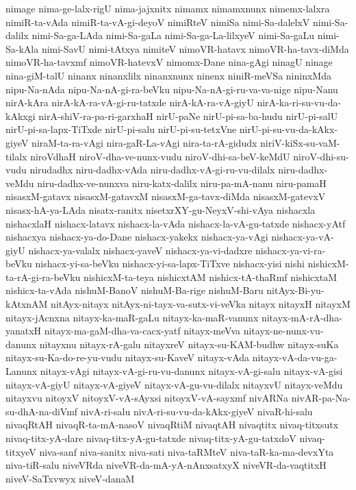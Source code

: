 {nimage
nima-ge-lalx-rigU
nima-jajxnitx
nimamx
nimamxnunx
nimemx-lalxra
nimiR-ta-vAda
nimiR-ta-vA-gi-deyoV
nimiRteV
nimiSa
nimi-Sa-dalelxV
nimi-Sa-dalilx
nimi-Sa-ga-LAda
nimi-Sa-gaLa
nimi-Sa-ga-La-lilxyeV
nimi-Sa-gaLu
nimi-Sa-kAla
nimi-SavU
nimi-tAtxya
nimiteV
nimoVR-hatavx
nimoVR-ha-tavx-diMda
nimoVR-ha-tavxmf
nimoVR-hatevxV
nimomx-Dane
nina-gAgi
ninagU
ninage
nina-giM-talU
ninanx
ninanxlilx
ninanxnunx
ninenx
niniR-meVSa
nininxMda
nipu-Na-nAda
nipu-Na-nA-gi-ra-beVku
nipu-Na-nA-gi-ru-va-va-nige
nipu-Nanu
nirA-kAra
nirA-kA-ra-vA-gi-ru-tatxde
nirA-kA-ra-vA-giyU
nirA-ka-ri-su-vu-da-kAkxgi
nirA-shiV-ra-pa-ri-garxhaH
nirU-paNe
nirU-pi-sa-ba-hudu
nirU-pi-salU
nirU-pi-sa-lapx-TiTxde
nirU-pi-salu
nirU-pi-su-tetxVne
nirU-pi-su-vu-da-kAkx-giyeV
niraM-ta-ra-vAgi
nira-gaR-La-vAgi
nira-ta-rA-gidudx
niriV-kiSx-su-vaM-tilalx
niroVdhaH
niroV-dha-ve-nunx-vudu
niroV-dhi-sa-beV-keMdU
niroV-dhi-su-vudu
nirudadhx
niru-dadhx-vAda
niru-dadhx-vA-gi-ru-vu-dilalx
niru-dadhx-veMdu
niru-dadhx-ve-nunxva
niru-katx-dalilx
niru-pa-mA-nanu
niru-pamaH
nisasxM-gatavx
nisasxM-gatavxM
nisasxM-ga-tavx-diMda
nisasxM-gatevxV
nisasx-hA-ya-LAda
nisatx-ranitx
nisetxrXY-gu-NeyxV-shi-vAya
nishacxla
nishacxlaH
nishacx-latavx
nishacx-la-vAda
nishacx-la-vA-gu-tatxde
nishacx-yAtf
nishacxya
nishacx-ya-do-Dane
nishacx-yakekx
nishacx-ya-vAgi
nishacx-ya-vA-giyU
nishacx-ya-valalx
nishacx-yaveV
nishacx-ya-vi-dadxre
nishacx-ya-vi-ra-beVku
nishacx-yi-sa-beVku
nishacx-yi-sa-lapx-TiTxve
nishacx-yisi
nishi
nishicxM-ta-rA-gi-ra-beVku
nishicxM-ta-teya
nishicxtAM
nishicx-tA-thaRmf
nishicxtaM
nishicx-ta-vAda
nishuM-BanoV
nishuM-Ba-rige
nishuM-Baru
nitAyx-Bi-yu-kAtxnAM
nitAyx-nitayx
nitAyx-ni-tayx-va-sutx-vi-veVka
nitayx
nitayxH
nitayxM
nitayx-jAcnxna
nitayx-ka-maR-gaLu
nitayx-ka-maR-vanunx
nitayx-mA-rA-dha-yanatxH
nitayx-ma-gaM-dha-va-cacx-yatf
nitayx-meVva
nitayx-ne-nunx-vu-danunx
nitayxnu
nitayx-rA-galu
nitayxreV
nitayx-su-KAM-budhw
nitayx-suKa
nitayx-su-Ka-do-re-yu-vudu
nitayx-su-KaveV
nitayx-vAda
nitayx-vA-da-vu-ga-Lanunx
nitayx-vAgi
nitayx-vA-gi-ru-vu-danunx
nitayx-vA-gi-salu
nitayx-vA-gisi
nitayx-vA-giyU
nitayx-vA-giyeV
nitayx-vA-gu-vu-dilalx
nitayxvU
nitayx-veMdu
nitayxvu
nitoyxV
nitoyxV-vA-sAyxsi
nitoyxV-vA-sayxmf
nivARNa
nivAR-pa-Na-su-dhA-na-diVmf
nivA-ri-salu
nivA-ri-su-vu-da-kAkx-giyeV
nivaR-hi-salu
nivaqRtAH
nivaqR-ta-mA-nasoV
nivaqRtiM
nivaqtAH
nivaqtitx
nivaq-titxsutx
nivaq-titx-yA-dare
nivaq-titx-yA-gu-tatxde
nivaq-titx-yA-gu-tatxdoV
nivaq-titxyeV
niva-sanf
niva-sanitx
niva-sati
niva-taRMteV
niva-taR-ka-ma-devxYta
niva-tiR-salu
niveVRda
niveVR-da-mA-yA-nAnxsatxyX
niveVR-da-vaqtitxH
niveV-SaTxvwyx
niveV-danaM
}
